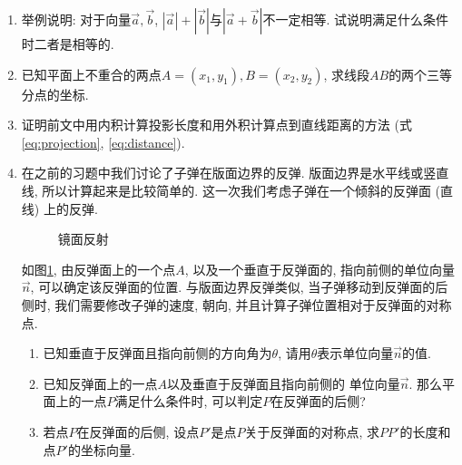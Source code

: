 \begin{enumerate}
  \item 举例说明: 对于向量$\vec a,\vec b$,
        $|\vec a| + |\vec b|$与$|\vec a + \vec b|$不一定相等.
        试说明满足什么条件时二者是相等的.

  \item 已知平面上不重合的两点$A=(x_1,y_1),B=(x_2,y_2)$,
        求线段$AB$的两个三等分点的坐标.

  \item \comment{*}
        证明前文中用内积计算投影长度和用外积计算点到直线距离的方法
        (式\ref{eq:projection}, \ref{eq:distance}).

  \item {}
        在之前的习题中我们讨论了子弹在版面边界的反弹.
        版面边界是水平线或竖直线, 所以计算起来是比较简单的.
        这一次我们考虑子弹在一个倾斜的反弹面 (直线) 上的反弹.

        \begin{figure}[htbp]
          \centering
          \caption{镜面反射}
          \label{fig:rebound-v2}
        \end{figure}

        如图\ref{fig:rebound-v2},
        由反弹面上的一个点$A$, 以及一个垂直于反弹面的,
        指向前侧的单位向量$\vec n$, 可以确定该反弹面的位置.
        与版面边界反弹类似, 当子弹移动到反弹面的后侧时,
        我们需要修改子弹的速度, 朝向,
        并且计算子弹位置相对于反弹面的对称点.

        \begin{enumerate}[label=(\alph*)]
          \item 已知垂直于反弹面且指向前侧的方向角为$\theta$,
                请用$\theta$表示单位向量$\vec n$的值.
          \item 已知反弹面上的一点$A$以及垂直于反弹面且指向前侧的
                单位向量$\vec n$. 那么平面上的一点$P$满足什么条件时,
                可以判定$P$在反弹面的后侧?
          \item 若点$P$在反弹面的后侧, 设点$P'$是点$P$关于反弹面的对称点,
                求$PP'$的长度和点$P'$的坐标向量.
        \end{enumerate}
\end{enumerate}

